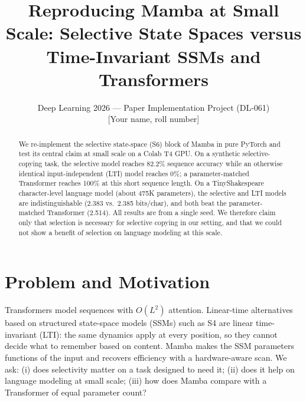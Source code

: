 \documentclass[10pt,twocolumn]{article}
\begin{document}
\title{\vspace{-1em}\large\bfseries Reproducing Mamba at Small Scale: Selective State Spaces versus Time-Invariant SSMs and Transformers\vspace{-0.5em}}
\author{\small Deep Learning 2026 --- Paper Implementation Project (DL-061)\\ \small [Your name, roll number]}
\date{}
\maketitle\vspace{-1.5em}

\begin{abstract}
\small We re-implement the selective state-space (S6) block of Mamba \cite{gu2023mamba} in pure PyTorch and test its central claim at small scale on a Colab T4 GPU. On a synthetic selective-copying task, the selective model reaches 82.2\% sequence accuracy while an otherwise identical input-independent (LTI) model reaches 0\%; a parameter-matched Transformer reaches 100\% at this short sequence length. On a TinyShakespeare character-level language model (about 475K parameters), the selective and LTI models are indistinguishable (2.383 vs.\ 2.385 bits/char), and both beat the parameter-matched Transformer (2.514). All results are from a single seed. We therefore claim only that selection is necessary for selective copying in our setting, and that we could not show a benefit of selection on language modeling at this scale.
\end{abstract}

\section{Problem and Motivation}
Transformers model sequences with $O(L^2)$ attention. Linear-time alternatives based on structured state-space models (SSMs) such as S4 \cite{s4} are linear time-invariant (LTI): the same dynamics apply at every position, so they cannot decide what to remember based on content. Mamba makes the SSM parameters functions of the input and recovers efficiency with a hardware-aware scan. We ask: (i) does selectivity matter on a task designed to need it; (ii) does it help on language modeling at small scale; (iii) how does Mamba compare with a Transformer of equal parameter count?
\end{document}
